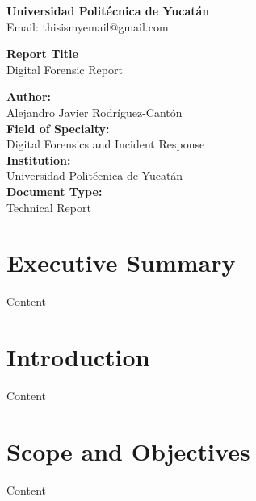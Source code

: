 \documentclass[12pt]{article}
\makeatletter
\newcommand{\myFullName}{Alejandro Javier Rodríguez-Cantón}         %
\newcommand{\myField}{Digital Forensics and Incident Response}
\newcommand{\myOrganization}{Universidad Politécnica de Yucatán}
\newcommand{\mySupervisor}{Prof. Angel Arturo Pech Che}             %
\newcommand{\myDocumentType}{Technical Report}
\newcommand{\myAddressLineOne}{Address Line 1}                      %
\newcommand{\myAddressLineTwo}{Address Line 2}                      %
\newcommand{\myEmail}{thisismyemail@gmail.com}
\newcommand{\myPhone}{+00 (000) 000-0000}                           %
\newcommand{\reportTitle}{Report Title}
\newcommand{\reportSubtitle}{Digital Forensic Report}
\makeatother
\begin{document}

\begin{flushright}
\textbf{\myOrganization}\\
Email: \myEmail      
\end{flushright}


\vspace{3cm}

\begin{center}
\Huge{\textbf{\reportTitle}}\\[1.5em]
\LARGE{\reportSubtitle}
\end{center}


\vspace{3cm}

\begin{flushleft}
\textbf{Author:}\\
\myFullName\\[1em]

\textbf{Field of Specialty:}\\
\myField\\[1em]

\textbf{Institution:}\\
\myOrganization\\[1em]


\textbf{Document Type:}\\
\myDocumentType\\[1em]
\end{flushleft}

\thispagestyle{empty}
\newpage

\tableofcontents
\newpage

\section{Executive Summary}
    Content

\section{Introduction}
    Content

\section{Scope and Objectives}
    Content
\end{document}
